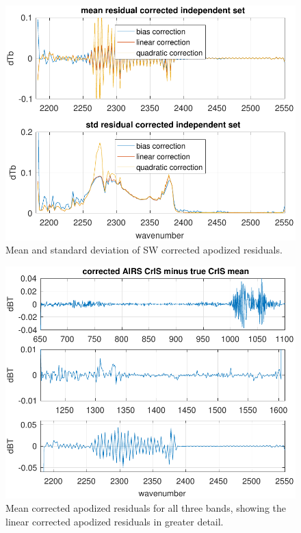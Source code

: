 \documentclass[10pt,twocolumn]{article}
\begin{document}
\begin{figure} %
  \centering
  \includegraphics[width=\linewidth]{figures/a2cris_regr_SW.pdf}
  \caption{Mean and standard deviation of SW corrected apodized
    residuals.}
  \label{statSW}
\end{figure}

\begin{figure} %
  \centering
  \includegraphics[width=\linewidth]{figures/ap_decon_corr.pdf}
  \caption{Mean corrected apodized residuals for all three bands,
    showing the linear corrected apodized residuals in greater
    detail.}
  \label{statAll1}
\end{figure}
\end{document}
